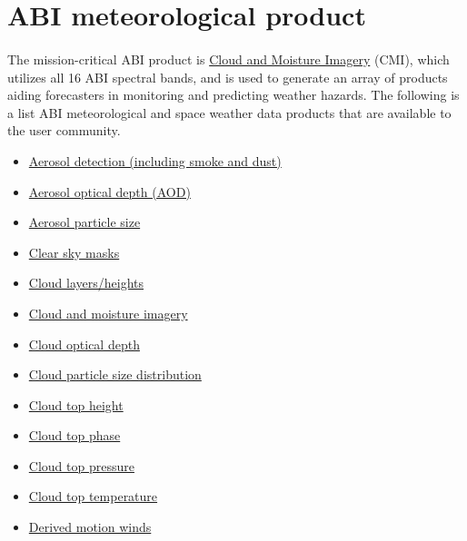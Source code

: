 \section{ABI meteorological product}
\paragraph{}
The mission-critical ABI product is \href{https://www.goes-r.gov/products/baseline-cloud-moisture-imagery.html}{Cloud and Moisture Imagery} (CMI), which utilizes all 16 ABI spectral bands,
and is used to generate an array of products aiding forecasters in monitoring and predicting weather hazards.
The following is a list ABI meteorological and space weather data products that are available to the user community.
\begin{itemize} 
\item \href{https://www.goes-r.gov/products/baseline-aerosol-detection.html}{Aerosol detection (including smoke and dust)} 
\item \href{https://www.goes-r.gov/products/baseline-aerosol-opt-depth.html}{Aerosol optical depth (AOD)}
\item \href{https://www.goes-r.gov/products/opt2-aerosol-particle-size.html}{Aerosol particle size}
\item \href{https://www.goes-r.gov/products/baseline-clear-sky-mask.html}{Clear sky masks}
\item \href{https://www.goes-r.gov/products/opt2-cloud-layers-height.html}{Cloud layers/heights}
\item \href{https://www.goes-r.gov/products/baseline-cloud-moisture-imagery.html}{Cloud and moisture imagery}
\item \href{https://www.goes-r.gov/products/baseline-cloud-opt-depth.html}{Cloud optical depth}
\item \href{https://www.goes-r.gov/products/baseline-cloud-particle-size-dist.html}{Cloud particle size distribution}
\item \href{https://www.goes-r.gov/products/baseline-cloud-top-height-cloud-layer.html}{Cloud top height} 
\item \href{https://www.goes-r.gov/products/baseline-cloud-phase.html}{Cloud top phase}
\item \href{https://www.goes-r.gov/products/baseline-cloud-top-pressure.html}{Cloud top pressure}
\item \href{https://www.goes-r.gov/products/baseline-cloud-top-temp.html}{Cloud top temperature}
\item \href{https://www.goes-r.gov/products/baseline-derived-motion-winds.html}{Derived motion winds}

\end{itemize}
